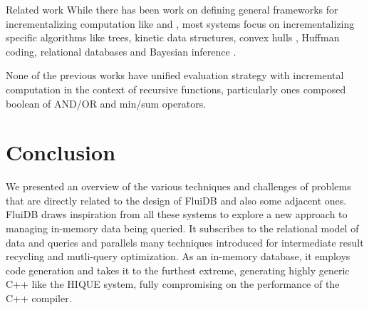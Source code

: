 \begin{corrected}{Related work}
While there has been work on defining general frameworks for
incrementalizing computation like
\cite{hammerAdaptonComposableDemanddriven2014a} and
\cite{andersonEfficientParallelSelfadjusting2021a}, most systems focus
on incrementalizing specific algorithms like
trees\cite{acarDynamizingStaticAlgorithms2004}, kinetic data
structures\cite{acarKineticAlgorithmsSelfadjusting2006}, convex hulls
\cite{acarExperimentalAnalysisSelfadjusting2009}, Huffman
coding\cite{acarTraceableDataTypes2010}, relational databases
\cite{hornIncrementalRelationalLenses2018} and Bayesian inference
\cite{acarAdaptiveBayesianInference2007}.



None of the previous works have unified evaluation strategy with
incremental computation in the context of recursive functions,
particularly ones composed boolean of AND/OR and min/sum operators.
\end{corrected}

\section{Conclusion}

We presented an overview of the various techniques and challenges of
problems that are directly related to the design of FluiDB and also
some adjacent ones. FluiDB draws inspiration from all these systems to
explore a new approach to managing in-memory data being queried. It
subscribes to the relational model of data and queries and parallels
many techniques introduced for intermediate result recycling and mutli-query
optimization. As an in-memory database, it employs code
generation and takes it to the furthest extreme, generating highly
generic C++ like the HIQUE system, fully compromising on the
performance of the C++ compiler.
